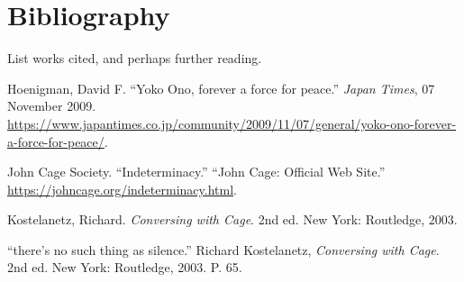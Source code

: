 

\newpage

\section{Bibliography}

List works cited, and perhaps further reading.


\begin{mybiblist}


\item Hoenigman, David F.  ``Yoko Ono, forever a force for peace.'' \textit{Japan Times}, 07 November 2009. \url{https://www.japantimes.co.jp/community/2009/11/07/general/yoko-ono-forever-a-force-for-peace/}.

\item John Cage Society.  ``Indeterminacy.''  ``John Cage: Official Web Site.'' \url{https://johncage.org/indeterminacy.html}.

\item Kostelanetz, Richard.  \textit{Conversing with Cage}.  2nd ed.  New York: Routledge, 2003.

\item ``there's no such thing as silence.''  Richard Kostelanetz, \textit{Conversing with Cage}.  2nd ed.  New York: Routledge, 2003.  P. 65.

\item





\end{mybiblist}

